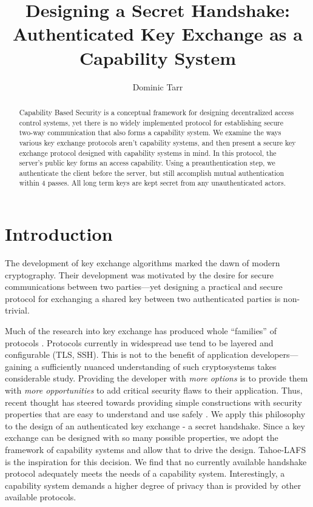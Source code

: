 \documentclass[12pt]{article}
\begin{document}
\title{Designing a Secret Handshake: Authenticated Key Exchange as a Capability System}
\author{Dominic Tarr}


\maketitle

\begin{abstract}
Capability Based Security is a conceptual framework for designing
decentralized access control systems, yet there is no widely
implemented protocol for establishing secure two-way communication
that also forms a capability system.
We examine the ways various key exchange protocols aren't
capability systems, and then present a secure key
exchange protocol designed with capability systems in mind.
In this protocol, the server's public key forms an access capability.
Using a preauthentication step, we authenticate the client before
the server, but still accomplish mutual authentication within 4 passes.
All long term keys are kept secret from any unauthenticated actors.

\end{abstract}

\section{Introduction}

The development of key exchange algorithms marked the dawn of
modern cryptography\cite{ndic}. Their development was motivated
by the desire for secure communications between two parties---yet
designing a practical and secure protocol for exchanging
a shared key between two authenticated parties is non-trivial\cite{aake}.

Much of the research into key exchange has produced whole ``families'' of
protocols \cite{sigma}. Protocols currently in widespread
use tend to be layered and configurable (TLS, SSH). This is not
to the benefit of application developers---gaining a sufficiently
nuanced understanding of such cryptosystems takes considerable study.
Providing the developer with \emph{more options} is to provide them
with \emph{more opportunities} to add critical security flaws to their
application. Thus, recent thought has steered towards providing simple constructions
with security properties that are easy to understand and use safely
\cite{nacl}. We apply this philosophy to the design of an authenticated
key exchange - a secret handshake. Since a key exchange can be designed
with so many possible properties, we adopt the framework of capability
systems\cite{unicap} and allow that to drive the design.
Tahoe-LAFS\cite{tahoe} is the inspiration for this decision.
We find that no currently available handshake protocol adequately meets
the needs of a capability system. Interestingly, a capability system
demands a higher degree of privacy than is provided by other available
protocols.
\end{document}

